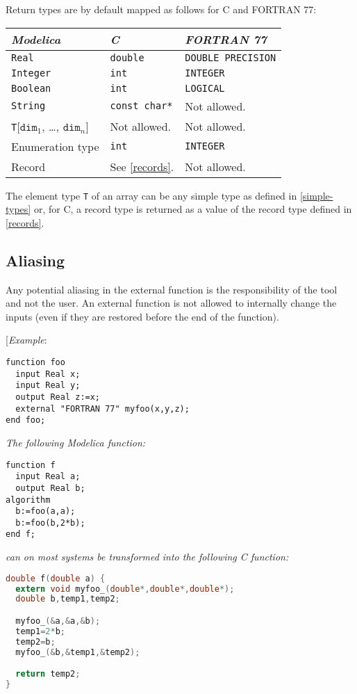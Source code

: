 Return types are by default mapped as follows for C and FORTRAN 77:

\begin{longtable}[]{|l|l|l|}
\hline
\emph{Modelica} & \emph{C} & \emph{FORTRAN 77}\\ \hline
\endhead
\lstinline!Real! & \lstinline!double! & \lstinline!DOUBLE PRECISION!\\ \hline
\lstinline!Integer! & \lstinline!int! & \lstinline!INTEGER!\\ \hline
\lstinline!Boolean! & \lstinline!int! & \lstinline!LOGICAL!\\ \hline
\lstinline!String! & \lstinline!const char*! & Not allowed.\\ \hline
\texttt{T}{[}$\texttt{dim}_1$, \ldots{}, $\texttt{dim}_{n}${]} & Not allowed. & Not allowed.\\ \hline
Enumeration type & \lstinline!int! & \lstinline!INTEGER!\\ \hline
Record & See \autoref{records}. & Not allowed.\\ \hline
\end{longtable}

The element type \lstinline!T! of an array can be any simple type as defined in
\autoref{simple-types} or, for C, a record type is returned as a value of the
record type defined in \autoref{records}.

\subsection{Aliasing}

Any potential aliasing in the external function is the responsibility of
the tool and not the user. An external function is not allowed to
internally change the inputs (even if they are restored before the end
of the function).

{[}\emph{Example}:

\begin{lstlisting}[language=modelica]
function foo
  input Real x;
  input Real y;
  output Real z:=x;
  external "FORTRAN 77" myfoo(x,y,z);
end foo;
\end{lstlisting}
\emph{The following Modelica function:}

\begin{lstlisting}[language=modelica]
function f
  input Real a;
  output Real b;
algorithm
  b:=foo(a,a);
  b:=foo(b,2*b);
end f;
\end{lstlisting}
\emph{can on most systems be transformed into the following C function:}
\begin{lstlisting}[language=C]
double f(double a) {
  extern void myfoo_(double*,double*,double*);
  double b,temp1,temp2;

  myfoo_(&a,&a,&b);
  temp1=2*b;
  temp2=b;
  myfoo_(&b,&temp1,&temp2);

  return temp2;
}
\end{lstlisting}


